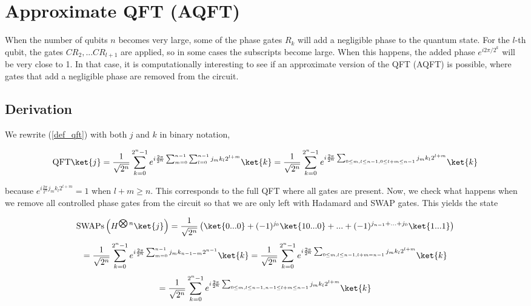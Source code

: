 \newpage
\section{Approximate QFT (AQFT)}
When the number of qubits $n$ becomes very large, some of the phase gates $R_k$ will add a negligible phase to the quantum state. For the $l$-th qubit, the gates $CR_2, ... CR_{l+1}$ are applied, so in some cases the subscripts become large. When this happens, the added phase $e^{i 2\pi / 2^k}$ will be very close to 1. In that case, it is computationally interesting to see if an approximate version of the QFT (AQFT) is possible, where gates that add a negligible phase are removed from the circuit. 

\subsection{Derivation}
We rewrite (\ref{def_qft}) with both $j$ and $k$ in binary notation,

\begin{equation}
    \text{QFT}\ket{j} = \frac{1}{\sqrt{2^n}}\sum_{k=0}^{2^n - 1}e^{i \frac{2\pi}{2^n}\sum_{m=0}^{n-1}\sum_{l=0}^{n-1}j_mk_l 2^{l+m}} \ket{k} = \frac{1}{\sqrt{2^n}}\sum_{k=0}^{2^n - 1}e^{i \frac{2\pi}{2^n}\sum_{0\leq m,l \leq n-1, 0 \leq l+m \leq n-1}j_mk_l 2^{l+m}} \ket{k}
    \label{full_qft}
\end{equation}

because $e^{i\frac{2\pi}{2^n}j_mk_l2^{l+m}} = 1$ when $l+m \geq n$. This corresponds to the full QFT where all gates are present. Now, we check what happens when we remove all controlled phase gates from the circuit so that we are only left with Hadamard and SWAP gates. This yields the state

\begin{equation*}
    \text{SWAPs}\left(H^{\bigotimes n}\ket{j}\right) = \frac{1}{\sqrt{2^n}}\left(\ket{0...0} + (-1)^{j_0}\ket{10...0} + ... + (-1)^{j_{n-1}+...+j_0}\ket{1...1}\right) 
\end{equation*}
\begin{equation*}
    = \frac{1}{\sqrt{2^n}} \sum_{k=0}^{2^n-1}e^{i\frac{2\pi}{2^n}\sum_{m=0}^{n-1}j_m k_{n-1-m}2^{n-1}}\ket{k} = \frac{1}{\sqrt{2^n}} \sum_{k=0}^{2^n-1}e^{i\frac{2\pi}{2^n}\sum_{0\leq m,l \leq n-1, l+m = n-1}j_m k_l 2^{l+m}}\ket{k} 
\end{equation*}
\begin{equation}
    = \frac{1}{\sqrt{2^n}} \sum_{k=0}^{2^n-1}e^{i\frac{2\pi}{2^n}\sum_{0\leq m,l \leq n-1, n-1 \leq l+m \leq n-1}j_m k_l 2^{l+m}}\ket{k}
    \label{hadamard_transform}
\end{equation}

